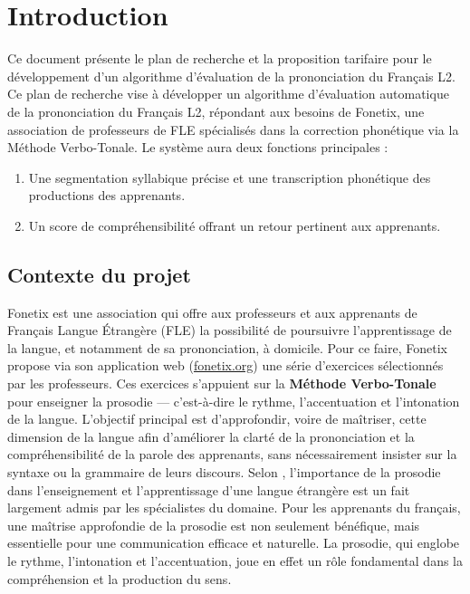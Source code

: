 \documentclass[11pt,a4paper]{article}
\begin{document}
\tableofcontents
\newpage

\section{Introduction}

Ce document présente le plan de recherche et la proposition tarifaire pour le développement d'un algorithme d'évaluation de la prononciation du Français L2. \newline
Ce plan de recherche vise à développer un algorithme d'évaluation automatique de la prononciation du Français L2, répondant aux besoins de Fonetix, une association de professeurs de FLE spécialisés dans la correction phonétique via la Méthode Verbo-Tonale. Le système aura deux fonctions principales :
\begin{enumerate}
    \item Une segmentation syllabique précise et une transcription phonétique des productions des apprenants.
    \item Un score de compréhensibilité offrant un retour pertinent aux apprenants.
\end{enumerate}


\subsection{Contexte du projet}

Fonetix est une association qui offre aux professeurs et aux apprenants de Français Langue Étrangère (FLE) la possibilité de poursuivre l'apprentissage de la langue, et notamment de sa prononciation, à domicile. Pour ce faire, Fonetix propose via son application web (\url{fonetix.org}) une série d'exercices sélectionnés par les professeurs. Ces exercices s'appuient sur la \textbf{Méthode Verbo-Tonale} pour enseigner la prosodie — c'est-à-dire le rythme, l'accentuation et l'intonation de la langue. L'objectif principal est d'approfondir, voire de maîtriser, cette dimension de la langue afin d'améliorer la clarté de la prononciation et la compréhensibilité de la parole des apprenants, sans nécessairement insister sur la syntaxe ou la grammaire de leurs discours.
Selon \cite{borrell2002didactique}, l'importance de la prosodie dans l'enseignement et l'apprentissage d'une langue étrangère est un fait largement admis par les spécialistes du domaine. Pour les apprenants du français, une maîtrise approfondie de la prosodie est non seulement bénéfique, mais essentielle pour une communication efficace et naturelle. La prosodie, qui englobe le rythme, l'intonation et l'accentuation, joue en effet un rôle fondamental dans la compréhension et la production du sens.
\end{document}
